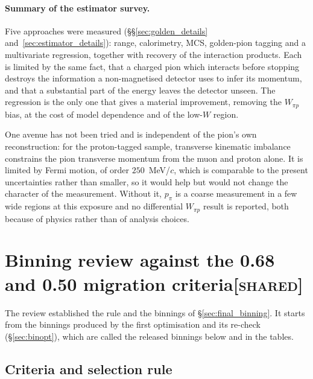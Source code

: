 \documentclass[11pt,a4paper]{article}
\newcommand{\scopetag}[1]{\hfill{\normalfont\small\textsc{[#1]}}}
\begin{document}
\paragraph{Summary of the estimator survey.} Five approaches were measured
(\S\S\ref{sec:golden_details} and~\ref{sec:estimator_details}):
range, calorimetry, MCS, golden-pion tagging and a multivariate regression, together with
recovery of the interaction products. Each is limited by the same fact, that a charged pion
which interacts before stopping destroys the information a non-magnetised detector uses to
infer its momentum, and that a substantial part of the energy leaves the detector unseen.
The regression is the only one that gives a material improvement, removing the $W_{\pi p}$
bias, at the cost of model dependence and of the low-$W$ region.

One avenue has not been tried and is independent of the pion's own reconstruction: for the
proton-tagged sample, transverse kinematic imbalance constrains the pion transverse momentum
from the muon and proton alone. It is limited by Fermi motion, of order $250$~MeV/$c$, which
is comparable to the present uncertainties rather than smaller, so it would help
but would not change the character of the measurement. Without it,
$p_\pi$ is a coarse measurement in a few wide regions at this exposure and no differential
$W_{\pi p}$ result is reported, both because of physics rather than of analysis choices.


\section[Binning review against the 0.68 and 0.50 migration criteria]{Binning review against the 0.68 and 0.50 migration criteria\scopetag{shared}}
\label{sec:binreview}

The review established the rule and the binnings of \S\ref{sec:final_binning}. It starts from the
binnings produced by the first optimisation and its re-check (\S\ref{sec:binopt}), which are called
the released binnings below and in the tables.

\subsection{Criteria and selection rule}
\end{document}
